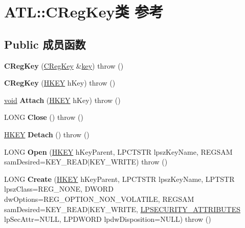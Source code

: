 \hypertarget{class_a_t_l_1_1_c_reg_key}{}\section{A\+TL\+:\+:C\+Reg\+Key类 参考}
\label{class_a_t_l_1_1_c_reg_key}
\subsection*{Public 成员函数}
\begin{DoxyCompactItemize}
\item 
\mbox{\label{class_a_t_l_1_1_c_reg_key_a68e62156f43aa7aff95f5f92869043d6}} 
{\bfseries C\+Reg\+Key} (\hyperlink{class_a_t_l_1_1_c_reg_key}{C\+Reg\+Key} \&\hyperlink{structkey}{key})  throw ()
\item 
\mbox{\label{class_a_t_l_1_1_c_reg_key_ab8bb2df2b7725c20b8e2271d1703818d}} 
{\bfseries C\+Reg\+Key} (\hyperlink{interfacevoid}{H\+K\+EY} h\+Key)  throw ()
\item 
\mbox{\label{class_a_t_l_1_1_c_reg_key_a427ab53b4c2d29c3c3f25d65fb697cf6}} 
\hyperlink{interfacevoid}{void} {\bfseries Attach} (\hyperlink{interfacevoid}{H\+K\+EY} h\+Key)  throw ()
\item 
\mbox{\label{class_a_t_l_1_1_c_reg_key_a51f77728d66fa4ec12c28b2341533219}} 
L\+O\+NG {\bfseries Close} ()  throw ()
\item 
\mbox{\label{class_a_t_l_1_1_c_reg_key_afb8716989782ff8db203223333ecbce0}} 
\hyperlink{interfacevoid}{H\+K\+EY} {\bfseries Detach} ()  throw ()
\item 
\mbox{\label{class_a_t_l_1_1_c_reg_key_a8407008560aa5e186b65115fa2331080}} 
L\+O\+NG {\bfseries Open} (\hyperlink{interfacevoid}{H\+K\+EY} h\+Key\+Parent, L\+P\+C\+T\+S\+TR lpsz\+Key\+Name, R\+E\+G\+S\+AM sam\+Desired=K\+E\+Y\+\_\+\+R\+E\+AD$\vert$K\+E\+Y\+\_\+\+W\+R\+I\+TE)  throw ()
\item 
\mbox{\label{class_a_t_l_1_1_c_reg_key_aea03fc8db52b5cb71b85bdeed4aee3fd}} 
L\+O\+NG {\bfseries Create} (\hyperlink{interfacevoid}{H\+K\+EY} h\+Key\+Parent, L\+P\+C\+T\+S\+TR lpsz\+Key\+Name, L\+P\+T\+S\+TR lpsz\+Class=R\+E\+G\+\_\+\+N\+O\+NE, D\+W\+O\+RD dw\+Options=R\+E\+G\+\_\+\+O\+P\+T\+I\+O\+N\+\_\+\+N\+O\+N\+\_\+\+V\+O\+L\+A\+T\+I\+LE, R\+E\+G\+S\+AM sam\+Desired=K\+E\+Y\+\_\+\+R\+E\+AD$\vert$K\+E\+Y\+\_\+\+W\+R\+I\+TE, \hyperlink{struct___s_e_c_u_r_i_t_y___a_t_t_r_i_b_u_t_e_s}{L\+P\+S\+E\+C\+U\+R\+I\+T\+Y\+\_\+\+A\+T\+T\+R\+I\+B\+U\+T\+ES} lp\+Sec\+Attr=N\+U\+LL, L\+P\+D\+W\+O\+RD lpdw\+Disposition=N\+U\+LL)  throw ()

\end{DoxyCompactItemize}
